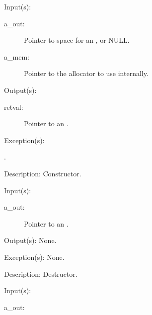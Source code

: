 \begin{capi}
	\begin{capilist}
	\item[Input(s): ]
		\begin{description}\item[]
		\item[a\_out: ]
			Pointer to space for an , or NULL.
		\item[a\_mem: ]
			Pointer to the allocator to use internally.
		\end{description}
	\item[Output(s): ]
		\begin{description}\item[]
		\item[retval: ]
			Pointer to an .
		\end{description}
	\item[Exception(s): ]
		\begin{description}\item[]
		\item[.]
		\end{description}
	\item[Description: ]
		Constructor.
	\end{capilist}
\label{out_delete}
	\begin{capilist}
	\item[Input(s): ]
		\begin{description}\item[]
		\item[a\_out: ]
			Pointer to an \classname{out}.
		\end{description}
	\item[Output(s): ] None.
	\item[Exception(s): ] None.
	\item[Description: ]
		Destructor.
	\end{capilist}
\label{out_register}
	\begin{capilist}
	\item[Input(s): ]
		\begin{description}\item[]
		\item[a\_out: ]

\end{description}
\end{capilist}
\end{capi}
